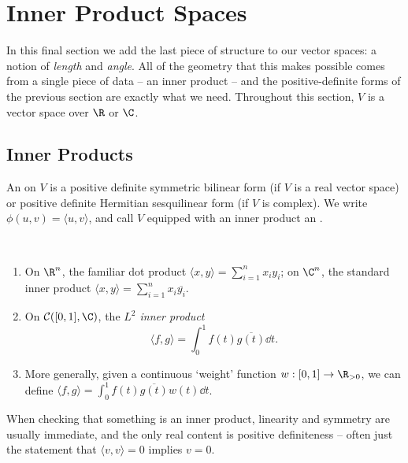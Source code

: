 \section{Inner Product Spaces}

In this final section we add the last piece of structure to our vector spaces: a notion of \emph{length} and \emph{angle}. All of the geometry that this makes possible comes from a single piece of data -- an inner product -- and the positive-definite forms of the previous section are exactly what we need. Throughout this section, $V$ is a vector space over $\R$ or $\C$.

\subsection{Inner Products}

\begin{definition}
    An  on $V$ is a positive definite symmetric bilinear form (if $V$ is a real vector space) or positive definite Hermitian sesquilinear form (if $V$ is complex). We write $\phi(u, v) = \langle u, v\rangle$, and call $V$ equipped with an inner product an .
\end{definition}

\begin{example}~
    \vspace{-1.5\baselineskip}
    \begin{enumerate}[label=(\roman*)]
        \item On $\R^n$, the familiar dot product $\langle x, y \rangle = \sum_{i = 1}^n x_i y_i$; on $\C^n$, the standard inner product $\langle x, y \rangle = \sum_{i = 1}^n x_i \overline{y_i}$.
        \item On $\mathcal{C}([0,1], \C)$, the \emph{$L^2$ inner product}
        $$
        \langle f, g \rangle = \int_0^1 f(t)\overline{g(t)} \dd t.
        $$
        \item More generally, given a continuous `weight' function $w: [0, 1] \rightarrow \R_{> 0}$, we can define $\langle f, g\rangle = \int_0^1 f(t)\overline{g(t)}w(t) \dd t$.
    \end{enumerate}
\end{example}

When checking that something is an inner product, linearity and symmetry are usually immediate, and the only real content is positive definiteness -- often just the statement that $\langle v, v \rangle = 0$ implies $v = 0$.

